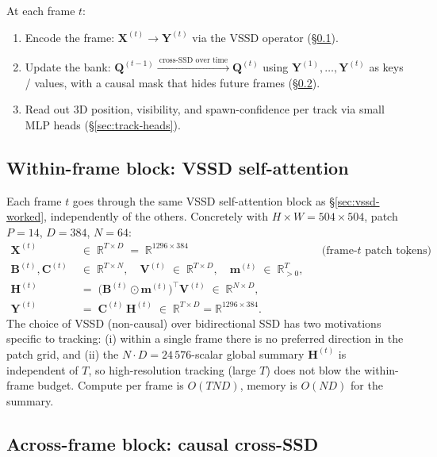\documentclass[11pt,a4paper]{article}
\begin{document}
At each frame $t$:

\begin{enumerate}
  \item Encode the frame: $\bm{X}^{(t)} \to \bm{Y}^{(t)}$ via the
        VSSD operator (\S\ref{sec:track-self}).
  \item Update the bank: $\bm{Q}^{(t-1)} \xrightarrow{~\text{cross-SSD over time}~} \bm{Q}^{(t)}$
        using $\bm{Y}^{(1)},\dots,\bm{Y}^{(t)}$ as keys / values, with
        a causal mask that hides future frames
        (\S\ref{sec:track-cross}).
  \item Read out 3D position, visibility, and spawn-confidence per
        track via small MLP heads (\S\ref{sec:track-heads}).
\end{enumerate}

\subsection{Within-frame block: VSSD self-attention}
\label{sec:track-self}

Each frame $t$ goes through the same VSSD self-attention block as
\S\ref{sec:vssd-worked}, independently of the others. Concretely
with $H\!\times\!W = 504\!\times\!504$, patch $P=14$, $D=384$,
$N=64$:
\begin{align}
  \bm{X}^{(t)} &\;\in\; \mathbb{R}^{T\times D} \;=\; \mathbb{R}^{1296\times 384}
  &&\text{(frame-$t$ patch tokens)}, \\
  \bm{B}^{(t)},\bm{C}^{(t)} &\;\in\; \mathbb{R}^{T\times N}, \quad
  \bm{V}^{(t)} \;\in\; \mathbb{R}^{T\times D}, \quad
  \bm{m}^{(t)} \;\in\; \mathbb{R}_{>0}^{T}, \\
  \bm{H}^{(t)} &\;=\; \bigl(\bm{B}^{(t)}\odot\bm{m}^{(t)}\bigr)^\top\bm{V}^{(t)}
  \;\in\; \mathbb{R}^{N\times D}, \\
  \bm{Y}^{(t)} &\;=\; \bm{C}^{(t)}\,\bm{H}^{(t)}
  \;\in\; \mathbb{R}^{T\times D} = \mathbb{R}^{1296\times 384}.
\end{align}
The choice of VSSD (non-causal) over bidirectional SSD has two
motivations specific to tracking: (i) within a single frame there is
no preferred direction in the patch grid, and (ii) the $N\!\cdot\!D
= 24\,576$-scalar global summary $\bm{H}^{(t)}$ is independent of
$T$, so high-resolution tracking (large $T$) does not blow the
within-frame budget. Compute per frame is $O(TND)$, memory is
$O(ND)$ for the summary.

\subsection{Across-frame block: causal cross-SSD}
\label{sec:track-cross}
\end{document}
